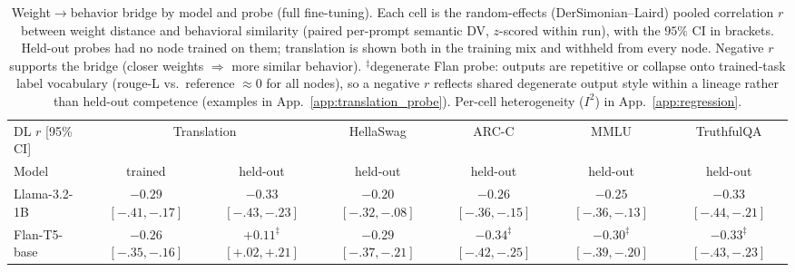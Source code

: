 \documentclass{article}
\theoremstyle{definition}
\theoremstyle{plain}
\begin{document}
\begin{table}[t]
\caption{Weight$\to$behavior bridge by model and probe (full fine-tuning). Each cell is the
random-effects (DerSimonian--Laird) pooled correlation $r$ between weight distance and behavioral
similarity (paired per-prompt semantic DV, $z$-scored within run), with the $95\%$ CI in brackets.
Held-out probes had no node trained on them; translation is shown both in the training mix
and withheld from every node. Negative $r$ supports the bridge (closer weights $\Rightarrow$ more
similar behavior). $^\ddagger$degenerate Flan probe: outputs are repetitive or collapse onto trained-task label
vocabulary (rouge-L vs.\ reference $\approx 0$ for all nodes), so a negative $r$ reflects shared
degenerate output style within a lineage rather than held-out competence (examples in
App.~\ref{app:translation_probe}). Per-cell heterogeneity ($I^2$) in App.~\ref{app:regression}.}
\label{tab:behavior_holdout}
\centering
\small
\setlength{\tabcolsep}{5pt}
\begin{tabular}{lcccccc}
\toprule
DL $r$ [95\% CI] & \multicolumn{2}{c}{Translation} & HellaSwag & ARC-C & MMLU & TruthfulQA \\
\cmidrule(lr){2-3}
Model & trained & held-out & held-out & held-out & held-out & held-out \\
\midrule
Llama-3.2-1B & \shortstack{$-0.29$\\{\scriptsize$[-.41,-.17]$}} & \shortstack{$-0.33$\\{\scriptsize$[-.43,-.23]$}} & \shortstack{$-0.20$\\{\scriptsize$[-.32,-.08]$}} & \shortstack{$-0.26$\\{\scriptsize$[-.36,-.15]$}} & \shortstack{$-0.25$\\{\scriptsize$[-.36,-.13]$}} & \shortstack{$-0.33$\\{\scriptsize$[-.44,-.21]$}} \\
\addlinespace
Flan-T5-base & \shortstack{$-0.26$\\{\scriptsize$[-.35,-.16]$}} & \shortstack{$+0.11^{\ddagger}$\\{\scriptsize$[+.02,+.21]$}} & \shortstack{$-0.29$\\{\scriptsize$[-.37,-.21]$}} & \shortstack{$-0.34^{\ddagger}$\\{\scriptsize$[-.42,-.25]$}} & \shortstack{$-0.30^{\ddagger}$\\{\scriptsize$[-.39,-.20]$}} & \shortstack{$-0.33^{\ddagger}$\\{\scriptsize$[-.43,-.23]$}} \\
\bottomrule
\end{tabular}
\end{table}
\end{document}
